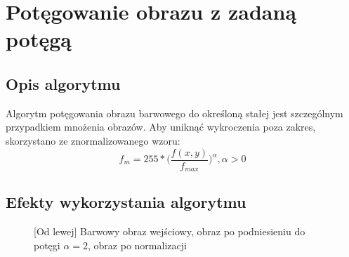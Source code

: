 \documentclass[a4paper,12pt, titlepage]{report}
\begin{document}
\section{Potęgowanie obrazu z zadaną potęgą}
\subsection*{Opis algorytmu}
\par Algorytm potęgowania obrazu barwowego do określoną stałej jest szczególnym przypadkiem mnożenia obrazów. Aby uniknąć wykroczenia poza zakres, skorzystano ze znormalizowanego wzoru: \[f_{m}=255*\Big(\frac{f(x,y)}{f_{max}}\Big)^{\alpha},  \alpha>0\]
\subsection*{Efekty wykorzystania algorytmu}
\begin{figure}[h]
    \centering
    \caption{[Od lewej] Barwowy obraz wejściowy, obraz po podniesieniu do potęgi \(\alpha=2\), obraz po normalizacji}%
    \label{fig:geo_after_grey1}%
\end{figure}
\end{document}
